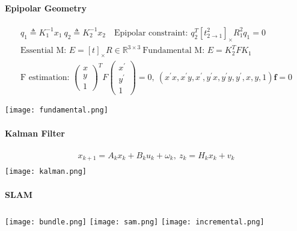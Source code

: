 \documentclass[a4paper,twocolumn]{scrreprt}
\begin{document}
\paragraph*{Epipolar Geometry}
{\tiny
\begin{gather*}
	q_1\triangleq K_1^{-1}x_1 ~	q_2 \triangleq K_2^{-1}x_2 \quad 
	\text{Epipolar constraint: } q_2^T[t^2_{2\to 1}]_\times R_1^2 q_1 = 0 \\
	\text{Essential M: } E = [t]_\times R \in \mathbb{R}^{3\times 3}~
	\text{Fundamental M: } E = K_2^{ T} F K_1 \\
	\text{F estimation: } 
	\begin{pmatrix}
	x \\ y \\ 1
	\end{pmatrix}^T F
	\begin{pmatrix}
	x^\prime \\ y^\prime \\ 1
	\end{pmatrix} = 0, ~
	\left(x^\prime x, x^\prime y, x^\prime, y^\prime x, y^\prime y, y^\prime, 
	x, y, 1\right) \bm{f} = 0
\end{gather*}

\texttt{[image: fundamental.png]} 
}

\paragraph*{Kalman Filter}
{\tiny
\begin{gather*}
	x_{k+1} = A_kx_k+B_ku_k+\omega_k, ~ z_k = H_kx_k+v_k \\
\end{gather*}
\texttt{[image: kalman.png]} 
}
\paragraph*{SLAM}
\begin{gather*}
\end{gather*}
\texttt{[image: bundle.png]} 
\texttt{[image: sam.png]} 
\texttt{[image: incremental.png]} 
\end{document}
